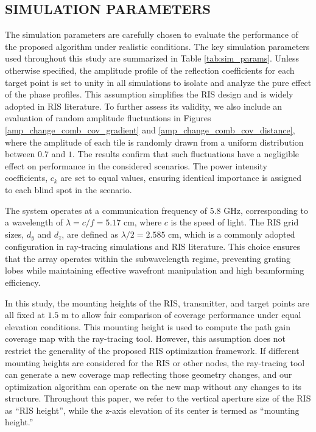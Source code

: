 \documentclass{IEEEoj}
\begin{document}
\subsection{SIMULATION PARAMETERS}
The simulation parameters are carefully chosen to evaluate the performance of the proposed algorithm under realistic conditions. The key simulation parameters used throughout this study are summarized in Table \ref{tab:sim_params}. Unless otherwise specified, the amplitude profile of the reflection coefficients for each target point is set to unity in all simulations to isolate and analyze the pure effect of the phase profiles. This assumption simplifies the RIS design and is widely adopted in RIS literature. To further assess its validity, we also include an evaluation of random amplitude fluctuations in Figures \ref{amp_change_comb_cov_gradient} and \ref{amp_change_comb_cov_distance}, where the amplitude of each tile is randomly drawn from a uniform distribution between $0.7$ and $1$. The results confirm that such fluctuations have a negligible effect on performance in the considered scenarios. The power intensity coefficients, $c_k$ are set to equal values, ensuring identical importance is assigned to each blind spot in the scenario.

The system operates at a communication frequency of $5.8$ GHz, corresponding to a wavelength of $\lambda = c/f = 5.17$ cm, where $c$ is the speed of light. The RIS grid sizes, $d_y$ and $d_z$, are defined as $\lambda / 2 = 2.585$ cm, which is a commonly adopted configuration in ray-tracing simulations and RIS literature. This choice ensures that the array operates within the subwavelength regime, preventing grating lobes while maintaining effective wavefront manipulation and high beamforming efficiency.

In this study, the mounting heights of the RIS, transmitter, and target points are all fixed at $1.5$ m to allow fair comparison of coverage performance under equal elevation conditions. This mounting height is used to compute the path gain coverage map with the ray-tracing tool. However, this assumption does not restrict the generality of the proposed RIS optimization framework. If different mounting heights are considered for the RIS or other nodes, the ray-tracing tool can generate a new coverage map reflecting those geometry changes, and our optimization algorithm can operate on the new map without any changes to its structure. Throughout this paper, we refer to the vertical aperture size of the RIS as “RIS height”, while the z-axis elevation of its center is termed as “mounting height.”
\end{document}
